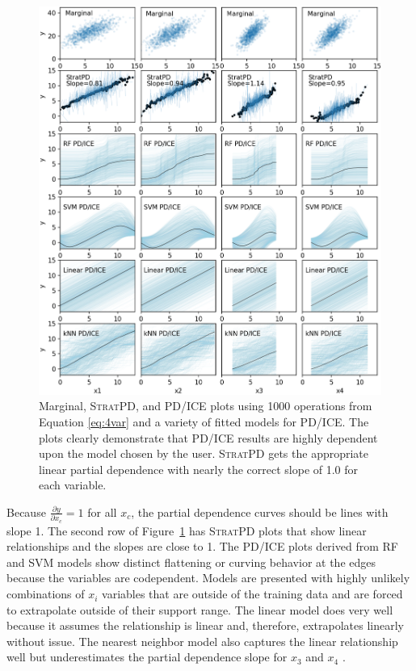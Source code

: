 \documentclass[12pt]{article}
\newcommand{\figref}[1]{Figure~\ref{#1}}
\newcommand{\todo}[1]{{{\color{red}{[#1]}}}}
\newcommand{\spd}{\fontfamily{cmr}\textsc{\small StratPD}}
\begin{document}
\begin{figure}[htbp]
\begin{center}
\includegraphics[scale=0.6]{images/multivar_multimodel_normal.png}
\caption{Marginal, \spd{}, and PD/ICE plots using 1000 operations from Equation \eqref{eq:4var} and a variety of fitted models for PD/ICE. The plots clearly demonstrate that PD/ICE results are highly dependent upon the model chosen by the user. \spd{} gets the appropriate linear partial dependence with nearly the correct slope of 1.0 for each variable.}
\label{fig:4var}
\end{center}
\end{figure}

Because $\frac{\partial y}{\partial x_{c}} = 1$ for all $x_c$, the partial dependence curves should be lines with slope 1.  The second row of \figref{fig:4var} has \spd{} plots that show linear relationships and the slopes are close to 1.  The PD/ICE plots derived from RF and SVM models show distinct flattening or curving behavior at the edges because the variables are codependent. Models are presented with highly unlikely combinations of $x_i$ \todo{$X_i$?} variables that are outside of the training data and are forced to extrapolate outside of their support range.  The linear model does very well because it assumes the relationship is linear and, therefore, extrapolates linearly without issue. The nearest neighbor model also captures the linear relationship well but underestimates the partial dependence slope for $x_3$ and $x_4$ \todo{$X_i$?} .
 
\end{document}
